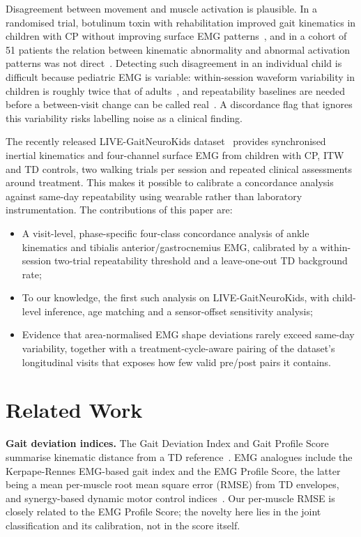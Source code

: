 \documentclass[conference]{IEEEtran}
\begin{document}
Disagreement between movement and muscle activation is plausible. In a randomised trial, botulinum toxin with rehabilitation improved gait kinematics in children with CP without improving surface EMG patterns~\cite{vanderhouwen2011btx}, and in a cohort of 51 patients the relation between kinematic abnormality and abnormal activation patterns was not direct~\cite{syczewska2016emg}. Detecting such disagreement in an individual child is difficult because pediatric EMG is variable: within-session waveform variability in children is roughly twice that of adults~\cite{granata2005repeat}, and repeatability baselines are needed before a between-visit change can be called real~\cite{steele2019repeat}. A discordance flag that ignores this variability risks labelling noise as a clinical finding.

The recently released LIVE-GaitNeuroKids dataset~\cite{fernandez2026live,zenodo2026live} provides synchronised inertial kinematics and four-channel surface EMG from children with CP, ITW and TD controls, two walking trials per session and repeated clinical assessments around treatment. This makes it possible to calibrate a concordance analysis against same-day repeatability using wearable rather than laboratory instrumentation. The contributions of this paper are:
\begin{itemize}
\item A visit-level, phase-specific four-class concordance analysis of ankle kinematics and tibialis anterior/gastrocnemius EMG, calibrated by a within-session two-trial repeatability threshold and a leave-one-out TD background rate;
\item To our knowledge, the first such analysis on LIVE-GaitNeuroKids, with child-level inference, age matching and a sensor-offset sensitivity analysis;
\item Evidence that area-normalised EMG shape deviations rarely exceed same-day variability, together with a treatment-cycle-aware pairing of the dataset's longitudinal visits that exposes how few valid pre/post pairs it contains.
\end{itemize}

\section{Related Work}
\textbf{Gait deviation indices.} The Gait Deviation Index and Gait Profile Score summarise kinematic distance from a TD reference~\cite{schwartz2008gdi,baker2009gps}. EMG analogues include the Kerpape-Rennes EMG-based gait index and the EMG Profile Score, the latter being a mean per-muscle root mean square error (RMSE) from TD envelopes, and synergy-based dynamic motor control indices~\cite{davoudi2025fingerprint,schwartz2016dmc}. Our per-muscle RMSE is closely related to the EMG Profile Score; the novelty here lies in the joint classification and its calibration, not in the score itself.
\end{document}
